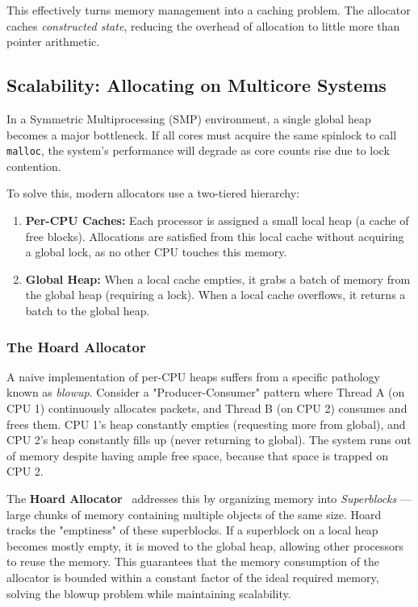 \documentclass[a4paper,10pt,twoside]{report}
\theoremstyle{definition}
\begin{document}
This effectively turns memory management into a caching problem. The allocator caches \textit{constructed state}, reducing the overhead of allocation to little more than pointer arithmetic.

\subsection{Scalability: Allocating on Multicore Systems}

In a Symmetric Multiprocessing (SMP) environment, a single global heap becomes a major bottleneck. If all cores must acquire the same spinlock to call \texttt{malloc}, the system's performance will degrade as core counts rise due to lock contention.

To solve this, modern allocators use a two-tiered hierarchy:
\begin{enumerate}
    \item \textbf{Per-CPU Caches:} Each processor is assigned a small local heap (a cache of free blocks). Allocations are satisfied from this local cache without acquiring a global lock, as no other CPU touches this memory.
    \item \textbf{Global Heap:} When a local cache empties, it grabs a batch of memory from the global heap (requiring a lock). When a local cache overflows, it returns a batch to the global heap.
\end{enumerate}

\subsubsection{The Hoard Allocator}
A naive implementation of per-CPU heaps suffers from a specific pathology known as \textit{blowup}. Consider a "Producer-Consumer" pattern where Thread A (on CPU 1) continuously allocates packets, and Thread B (on CPU 2) consumes and frees them. CPU 1's heap constantly empties (requesting more from global), and CPU 2's heap constantly fills up (never returning to global). The system runs out of memory despite having ample free space, because that space is trapped on CPU 2.

The \textbf{Hoard Allocator}~\cite{berger2000hoard} addresses this by organizing memory into \textit{Superblocks} --- large chunks of memory containing multiple objects of the same size. Hoard tracks the "emptiness" of these superblocks. If a superblock on a local heap becomes mostly empty, it is moved to the global heap, allowing other processors to reuse the memory. This guarantees that the memory consumption of the allocator is bounded within a constant factor of the ideal required memory, solving the blowup problem while maintaining scalability.
\end{document}
